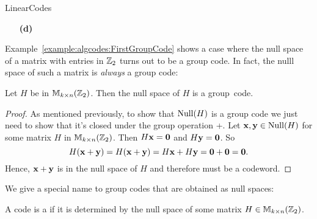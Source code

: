 \begin{exercise}{LinearCodes}
\begin{minipage}[t]{4.6in}
\begin{minipage}[t]{2.25in}
\begin{itemize}
\end{itemize}
\end{minipage} \hfill
\begin{minipage}[t]{2.25in}
\begin{itemize}
 
 \item[{\bf (d)}]
\end{itemize}
\end{minipage}
\end{minipage}




\end{exercise}
 

Example~\ref{example:algcodes:FirstGroupCode} shows a case where the null space of a matrix with entries in ${\Bbb Z}_2$ turns out to be a group code. In fact, the nulll space of such a matrix  is \emph{always} a group code: 
 
\begin{prop}{}
Let $H$ be in ${\Bbb M}_{k \times n}({\Bbb Z}_2)$. Then the null space of
$H$ is a group~code.
\end{prop}
  
\begin{proof}
As mentioned previously, to show that ${\rm Null}(H)$  is a group code we just need to show that it's closed under the group operation +. Let ${\bold x},
{\bold y} \in {\rm Null}(H)$ for some matrix $H$ in ${\Bbb M}_{k \times
n}({\Bbb Z}_2)$. Then $H{\bold x} = {\bold 0}$ and $H{\bold y} =
{\bold 0}$. So 
\[
H({\bold x}+{\bold y}) = H({\bold x} +{\bold y})
=
H{\bold x} + H{\bold y} = {\bold 0}
+
{\bold 0}
= {\bold 0}.
\]
Hence, ${\bold x}+{\bold y}$ is in the null space of $H$ and
therefore must be a codeword. 
\mbox{\hspace{1in}}
\end{proof}

We give a special name to  group codes that are obtained as null spaces:

\begin{defn}
A code is a  if it is
determined by the null space of some matrix $H \in {\Bbb M}_{k \times
n}({\Bbb Z}_2)$.  
 \end{defn}
 
